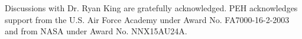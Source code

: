 Discussions with Dr. Ryan King are gratefully acknowledged. PEH acknowledges support from the U.S. Air Force Academy under Award No. FA7000-16-2-2003 and from NASA under Award No. NNX15AU24A.